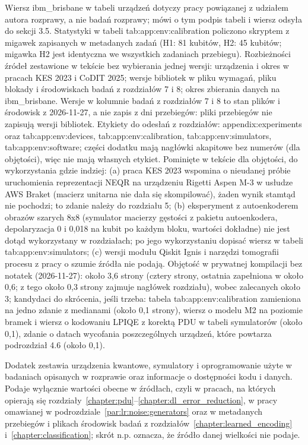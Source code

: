 {Wiersz ibm_brisbane w tabeli urządzeń dotyczy pracy powiązanej z udziałem autora rozprawy, a nie badań rozprawy; mówi o tym podpis tabeli i wiersz odsyła do sekcji 3.5.
Statystyki w tabeli tab:app:env:calibration policzono skryptem  z migawek zapisanych w metadanych zadań (H1: 81 kubitów, H2: 45 kubitów; migawka H2 jest identyczna we wszystkich zadaniach przebiegu).
Rozbieżności źródeł zestawione w tekście bez wybierania jednej wersji: urządzenia i okres w pracach KES 2023 i CoDIT 2025; wersje bibliotek w pliku wymagań, pliku blokady i środowiskach badań z rozdziałów 7 i 8; okres zbierania danych na ibm_brisbane.
Wersje w kolumnie badań z rozdziałów 7 i 8 to stan plików i środowisk z 2026-11-27, a nie zapis z dni przebiegów: pliki przebiegów nie zapisują wersji bibliotek.
Etykiety do odesłań z rozdziałów: appendix:experiments oraz tab:app:env:devices, tab:app:env:calibration, tab:app:env:simulators, tab:app:env:software; części dodatku mają nagłówki akapitowe bez numerów (dla objętości), więc nie mają własnych etykiet.
Pominięte w tekście dla objętości, do wykorzystania gdzie indziej: (a) praca KES 2023 wspomina o nieudanej próbie uruchomienia reprezentacji NEQR na urządzeniu Rigetti Aspen M-3 w usłudze AWS Braket (macierz unitarna nie dała się skompilować), żaden wynik stamtąd nie pochodzi; to zdanie należy do rozdziału 5; (b) eksperyment z autoenkoderem obrazów szarych 8x8  (symulator macierzy gęstości z pakietu autoenkodera, depolaryzacja 0 i 0,018 na kubit po każdym bloku, wartości dokładne) nie jest dotąd wykorzystany w rozdziałach; po jego wykorzystaniu dopisać wiersz w tabeli tab:app:env:simulators; (c) wersji modułu Qiskit Ignis i narzędzi tomografii procesu z pracy o szumie źródła nie podają.
Objętość w prywatnej kompilacji bez notatek (2026-11-27): około 3,6 strony (cztery strony, ostatnia zapełniona w około 0,6; z tego około 0,3 strony zajmuje nagłówek rozdziału), wobec zalecanych około 3; kandydaci do skrócenia, jeśli trzeba: tabela tab:app:env:calibration zamieniona na jedno zdanie z medianami (około 0,1 strony), wiersz o modelu M2 na poziomie bramek i wiersz o kodowaniu LPIQE z korektą PDU w tabeli symulatorów (około 0,1), zdanie o datach wycofania poszczególnych urządzeń, które powtarza podrozdział 4.6 (około 0,1).
}

Dodatek zestawia urządzenia kwantowe, symulatory i oprogramowanie użyte w badaniach opisanych w rozprawie oraz informacje o dostępności kodu i danych.
Podaje wyłącznie wartości obecne w źródłach, czyli w pracach, na których opierają się rozdziały~\ref{chapter:pdu}--\ref{chapter:dl_error_reduction}, w pracy~\cite{raubitzek_quantum_noise} omawianej w podrozdziale~\ref{par:lr:noise:generators} oraz w metadanych przebiegów i plikach środowisk badań z rozdziałów~\ref{chapter:learned_encoding} i~\ref{chapter:classification}; skrót n.p. oznacza, że źródło danej wielkości nie podaje.

